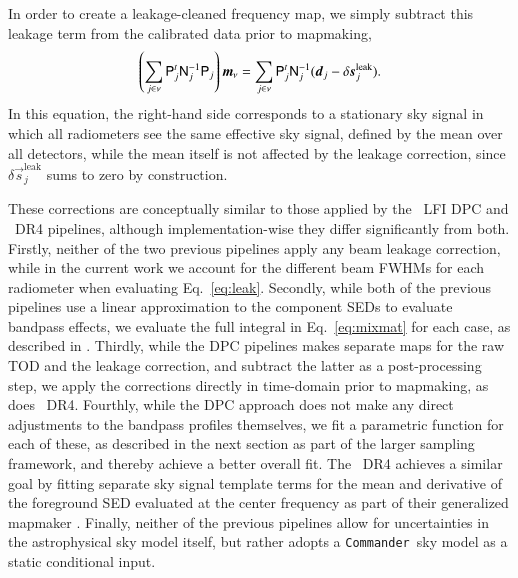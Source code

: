 \documentclass[twocolumn]{aa}
\def\commander{\texttt{Commander}}
\renewcommand{\d}[0]{\vec{d}}
\newcommand{\s}[0]{\vec{s}}
\newcommand{\m}[0]{\vec{m}}
\newcommand{\N}[0]{\tens{N}}
\renewcommand{\P}[0]{\tens{P}}
\newcommand{\?}[1]{\textcolor{red}{{\bf [#1]}}}
\begin{document}
In order to create a leakage-cleaned frequency map, we simply subtract
this leakage term from the calibrated data prior to mapmaking,
\begin{equation}
  \left(\sum_{j \in \nu} \P_j^t \N_{j}^{-1} \P_j\right) \m_{\nu} =
  \sum_{j \in \nu} \P_j^t \N_j^{-1}(\d_j -
  \delta\s^{\mathrm{leak}}_j).
  \label{eq:mapmaking_corr}
\end{equation}
In this equation, the right-hand side corresponds to a stationary sky
signal in which all radiometers see the same effective sky signal,
defined by the mean over all detectors, while the mean itself is not
affected by the leakage correction, since $\delta
\s^{\mathrm{leak}}_{j}$ sums to zero by construction.

These corrections are conceptually similar to those applied by the
\Planck\ LFI DPC \citep{planck2014-a03,planck2016-l02} and
\Planck\ DR4 \citep{npipe} pipelines, although implementation-wise they
differ significantly from both. Firstly, neither of the two previous
pipelines apply any beam leakage correction, while in the current work
we account for the different beam FWHMs for each radiometer
\citep{planck2014-a04} when evaluating Eq.~\eqref{eq:leak}. Secondly,
while both of the previous pipelines use a linear approximation to
the component SEDs to evaluate bandpass effects, we evaluate the full
integral in Eq.~\eqref{eq:mixmat} for each case, as described in
\citet{bp03}. Thirdly, while the DPC pipelines makes separate maps for
the raw TOD and the leakage correction, and subtract the latter as a
post-processing step, we apply the corrections directly in time-domain
prior to mapmaking, as does \Planck\ DR4. Fourthly, while the DPC
approach does not make any direct adjustments to the bandpass profiles
themselves, we fit a parametric function for each of these, as
described in the next section as part of the larger sampling
framework, and thereby achieve a better overall fit. The \Planck\ DR4
achieves a similar goal by fitting separate sky signal template terms
for the mean and derivative of the foreground SED evaluated at the
center frequency as part of their generalized mapmaker
\citep{npipe}. Finally, neither of the previous pipelines
allow for uncertainties in the astrophysical sky model itself, but
rather adopts a \commander\ sky model as a static conditional input.
\end{document}

